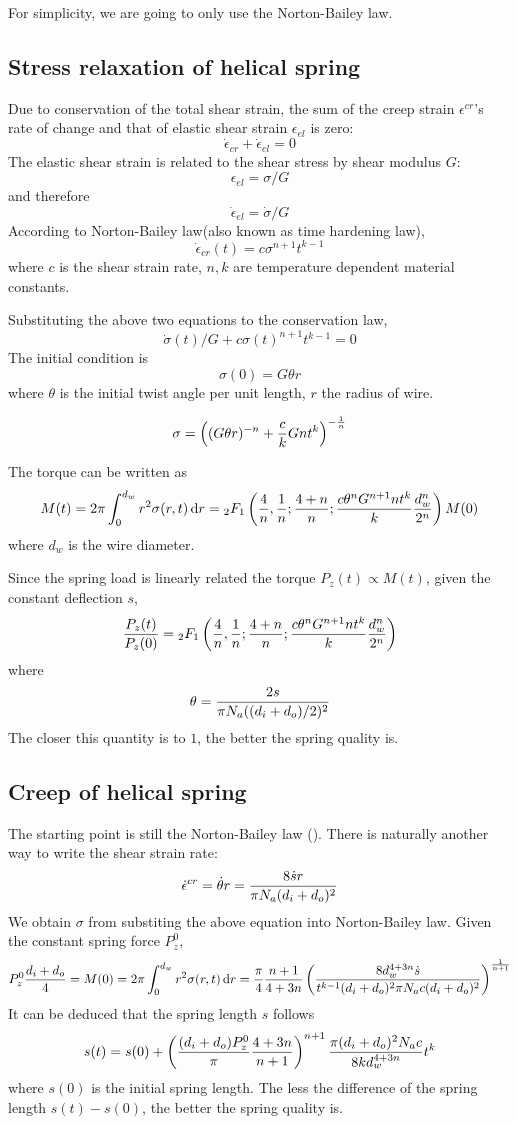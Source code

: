 \documentclass[10pt]{article}
\begin{document}
For simplicity, we are going to only use the Norton-Bailey law.
\subsection{Stress relaxation of helical spring}
\label{sec:Relaxation}
Due to conservation of the total shear strain, the sum of the creep strain $\epsilon^{cr}$'s rate of change and that of elastic shear strain $\epsilon_{el}$ is zero:
\[
\dot{\epsilon}_{cr} + \dot{\epsilon}_{el} = 0
\]
The elastic shear strain is related to the shear stress by shear modulus $G$:
\[
\epsilon_{el} = \sigma/G
\]
and therefore
\[
\dot{\epsilon}_{el} = \dot{\sigma}/G
\]
According to Norton-Bailey law(also known as time hardening law),
\begin{equation} \label{eq:N-B}
\dot{\epsilon}_{cr}(t)=c\sigma^{n+1} t^{k-1}
\end{equation}
where $c$ is the shear strain rate, $n,k$ are temperature dependent material constants.

Substituting the above two equations to the conservation law,
\begin{equation} \label{eq:diff}
\dot{\sigma}(t)/G+c\sigma(t)^{n+1} t^{k-1}=0
\end{equation}
The initial condition is
\[
\sigma (0) = G\theta r
\]
where $\theta$ is the initial twist angle per unit length, $r$ the radius of wire.

\[
\sigma = \left( (G\theta r)^{-n} + {c\over k} Gnt^k \right)^{-{1\over n}}
\]

The torque can be written as
\[
M(t) = 2\pi \int_0^{d_w} r^2 \sigma(r,t)\,\mathrm{d} r ={}_{2}F_1 \left( {4\over n},{1\over n};{4+n\over n};{c\theta^n G^{n+1} n t^k\over k} {d_w^n\over 2^n}\right) M(0)
\]
where $d_w$ is the wire diameter.

Since the spring load is linearly related the torque $P_z(t)\propto M(t)$, given the constant deflection $s$,
\[
{P_z(t)\over P_z(0)} = {}_{2}F_1 \left( {4\over n},{1\over n};{4+n\over n};{c\theta^n G^{n+1} n t^k\over k} {d_w^n\over 2^n}\right)
\]
where
\[
\theta = {2s\over \pi N_a ((d_i+d_o)/2)^2}
\]
The closer this quantity is to $1$, the better the spring quality is.

\subsection{Creep of helical spring}
The starting point is still the Norton-Bailey law (\label{eq:N-B}). There is naturally another way to write the shear strain rate:
\[
\dot{\epsilon}^{cr} = \dot{\theta} r = {8\dot{s} r\over \pi N_a (d_i+d_o)^2}
\]
We obtain $\sigma$ from substiting the above equation into Norton-Bailey law. Given the constant spring force $P_z^0$,
\[
P_z^0{d_i+d_o\over 4}=M(0)=2\pi\int_0^{d_w} r^2 \sigma(r,t)\,\mathrm{d} r
={\pi\over 4}{n+1\over 4+3n}\left( {8d_w^{4+3n}\dot{s} \over t^{k-1} (d_i+d_o)^2 \pi N_a c (d_i+d_o)^2} \right)^{{1\over n+1}}
\]
It can be deduced that the spring length $s$ follows
\[
s(t) = s(0) + \left( {(d_i+d_o)P_z^0\over \pi}{4+3n\over n+1} \right)^{n+1} {\pi (d_i+d_o)^2 N_a c\over 8kd_w^{4+3n}} t^k
\]
where $s(0)$ is the initial spring length. The less the difference of the spring length $s(t)-s(0)$, the better the spring quality is.
 
\end{document}
